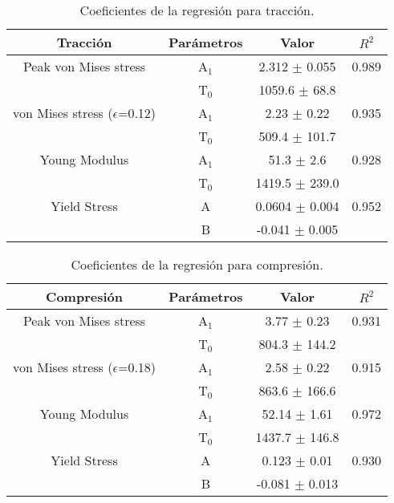 
\begin{table}[htp]
\caption[Coeficientes de la regresión para tracción.]{Coeficientes de la regresión para tracción.}
\begin{center}
\begin{tabular}{*{4}{c}}
\hline
\textbf{Tracción} & Parámetros & Valor & $R^{2}$ \\ \hline \hline
Peak von Mises stress & A$_{1}$ & 2.312 $\pm$ 0.055 & 0.989 \\
 & T$_{0}$ & 1059.6 $\pm$ 68.8 & \\ \hline
von Mises stress ($\epsilon$=0.12) & A$_{1}$ & 2.23 $\pm$ 0.22 & 0.935 \\
 & T$_{0}$ & 509.4 $\pm$ 101.7 & \\ \hline
Young Modulus & A$_{1}$ & 51.3 $\pm$ 2.6 & 0.928 \\
 & T$_{0}$ & 1419.5 $\pm$ 239.0 & \\ \hline
Yield Stress & A & 0.0604 $\pm$ 0.004 & 0.952 \\
 & B & -0.041 $\pm$ 0.005 & \\ \hline
\end{tabular}
\end{center}
\label{C3:tb:initPropsTen}
\end{table}

\begin{table}[htp]
\caption[Coeficientes de la regresión para compresión.]{Coeficientes de la regresión para compresión.}
\begin{center}
\begin{tabular}{*{4}{c}}
\hline
\textbf{Compresión} & Parámetros & Valor & $R^{2}$ \\ \hline \hline
Peak von Mises stress & A$_{1}$ & 3.77 $\pm$ 0.23 & 0.931 \\
 & T$_{0}$ & 804.3 $\pm$ 144.2 & \\ \hline
von Mises stress ($\epsilon$=0.18) & A$_{1}$ & 2.58 $\pm$ 0.22 & 0.915 \\
 & T$_{0}$ & 863.6 $\pm$ 166.6 & \\ \hline
Young Modulus & A$_{1}$ & 52.14 $\pm$ 1.61 & 0.972 \\
 & T$_{0}$ & 1437.7 $\pm$ 146.8 & \\ \hline
Yield Stress & A & 0.123 $\pm$ 0.01 & 0.930 \\
 & B & -0.081 $\pm$ 0.013 & \\ \hline
\end{tabular}
\end{center}
\label{C3:tb:initPropsComp}
\end{table}

